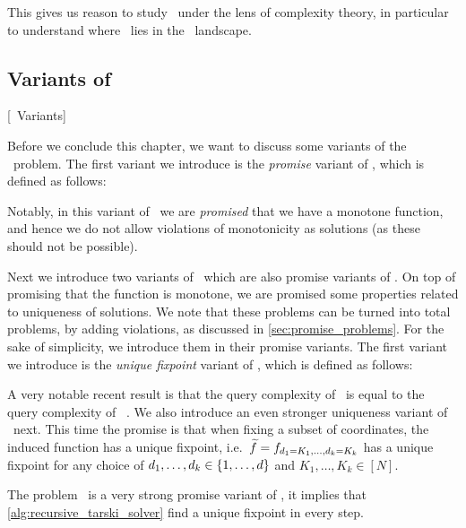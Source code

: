 This gives us reason to study \Tarski\ under the lens of complexity theory, in particular to understand where \Tarski\ lies in the \TFNP\ landscape.

\subsection{Variants of \Tarski}[\Tarski\ Variants]

Before we conclude this chapter, we want to discuss some variants of the \Tarski\ problem. The first variant we introduce is the \emph{promise} variant of \Tarski, which is defined as follows:


Notably, in this variant of \Tarski\ we are \emph{promised} that we have a monotone function, and hence we do not allow violations of monotonicity as solutions (as these should not be possible).

Next we introduce two variants of \Tarski\ which are also promise variants of \Tarski. On top of promising that the function is monotone, we are promised some properties related to uniqueness of solutions. We note that these problems can be turned into total problems, by adding violations, as discussed in \cref{sec:promise_problems}. For the sake of simplicity, we introduce them in their promise variants. The first variant we introduce is the \emph{unique fixpoint} variant of \Tarski, which is defined as follows:


A very notable recent result is that the query complexity of \SuperUniqueTarski\, \UniqueTarski is equal to the query complexity of \Tarski\ .  We also introduce an even stronger uniqueness variant of \Tarski\ next. This time the promise is that when fixing a subset of coordinates, the induced function has a unique fixpoint, i.e.\ $\widetilde{f} = f_{d_1=K_1, \dots, d_k=K_k}$ has a unique fixpoint for any choice of $d_1, \dots, d_k \in \left\{1, \dots, d\right\}$ and $K_1, \dots, K_k \in [N]$.


The problem \SuperUniqueTarski\ is a very strong promise variant of \Tarski, it implies that \cref{alg:recursive_tarski_solver} find a unique fixpoint in every step.